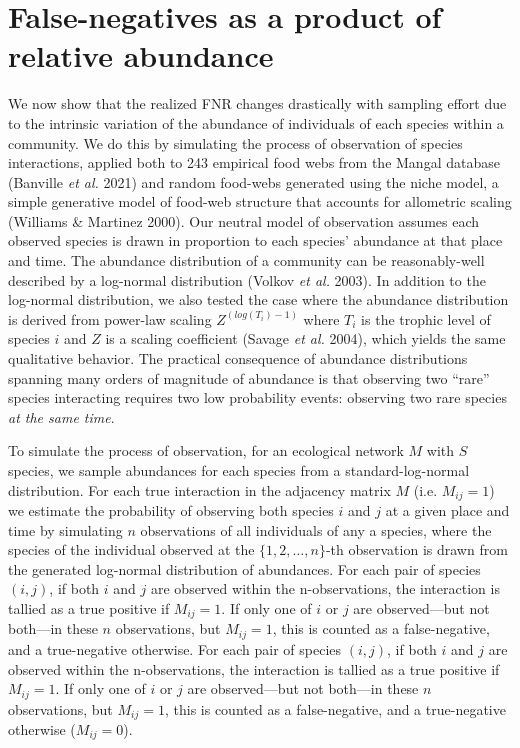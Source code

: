 \documentclass[11pt]{article}
\begin{document}
\hypertarget{false-negatives-as-a-product-of-relative-abundance}{%
\section{False-negatives as a product of relative
abundance}\label{false-negatives-as-a-product-of-relative-abundance}}

We now show that the realized FNR changes drastically with sampling
effort due to the intrinsic variation of the abundance of individuals of
each species within a community. We do this by simulating the process of
observation of species interactions, applied both to 243 empirical food
webs from the Mangal database (Banville \emph{et al.} 2021) and random
food-webs generated using the niche model, a simple generative model of
food-web structure that accounts for allometric scaling (Williams \&
Martinez 2000). Our neutral model of observation assumes each observed
species is drawn in proportion to each species' abundance at that place
and time. The abundance distribution of a community can be
reasonably-well described by a log-normal distribution (Volkov \emph{et
al.} 2003). In addition to the log-normal distribution, we also tested
the case where the abundance distribution is derived from power-law
scaling \(Z^{(log(T_i)-1)}\) where \(T_i\) is the trophic level of
species \(i\) and \(Z\) is a scaling coefficient (Savage \emph{et al.}
2004), which yields the same qualitative behavior. The practical
consequence of abundance distributions spanning many orders of magnitude
of abundance is that observing two ``rare'' species interacting requires
two low probability events: observing two rare species \emph{at the same
time}.

To simulate the process of observation, for an ecological network \(M\)
with \(S\) species, we sample abundances for each species from a
standard-log-normal distribution. For each true interaction in the
adjacency matrix \(M\) (i.e. \(M_{ij}=1\)) we estimate the probability
of observing both species \(i\) and \(j\) at a given place and time by
simulating \(n\) observations of all individuals of any a species, where
the species of the individual observed at the \(\{1,2,\dots,n\}\)-th
observation is drawn from the generated log-normal distribution of
abundances. For each pair of species \((i,j)\), if both \(i\) and \(j\)
are observed within the n-observations, the interaction is tallied as a
true positive if \(M_{ij}=1\). If only one of \(i\) or \(j\) are
observed---but not both---in these \(n\) observations, but \(M_{ij}=1\),
this is counted as a false-negative, and a true-negative otherwise. For
each pair of species \((i,j)\), if both \(i\) and \(j\) are observed
within the n-observations, the interaction is tallied as a true positive
if \(M_{ij}=1\). If only one of \(i\) or \(j\) are observed---but not
both---in these \(n\) observations, but \(M_{ij}=1\), this is counted as
a false-negative, and a true-negative otherwise (\(M_{ij} = 0\)).
\end{document}
